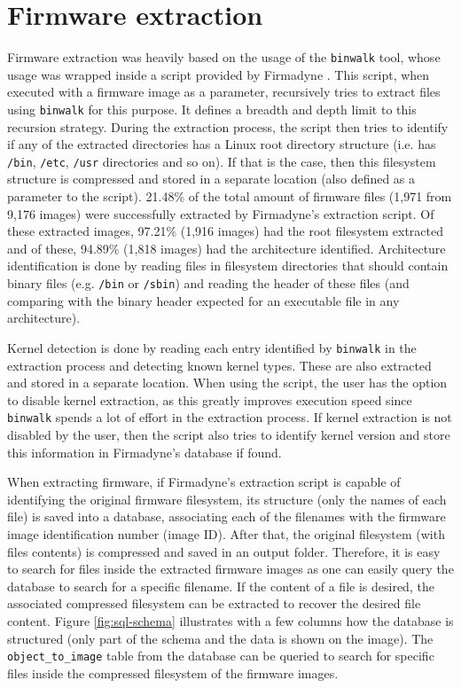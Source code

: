 \section{Firmware extraction}
\label{sec:firmware-extraction}

Firmware extraction was heavily based on the usage of the {\tt binwalk} tool, whose usage was wrapped inside a script provided by Firmadyne \cite{firmadyne}. This script, when executed with a firmware image as a parameter, recursively tries to extract files using {\tt binwalk} for this purpose. It defines a breadth and depth limit to this recursion strategy. During the extraction process, the script then tries to identify if any of the extracted directories has a Linux root directory structure (i.e. has {\tt /bin}, {\tt /etc}, {\tt /usr} directories and so on). If that is the case, then this filesystem structure is compressed and stored in a separate location (also defined as a parameter to the script). 21.48\% of the total amount of firmware files (1,971 from 9,176 images) were successfully extracted by Firmadyne's \cite{firmadyne} extraction script. Of these extracted images, 97.21\% (1,916 images) had the root filesystem extracted and of these, 94.89\% (1,818 images) had the architecture identified. Architecture identification is done by reading files in filesystem directories that should contain binary files (e.g. {\tt /bin} or {\tt /sbin}) and reading the header of these files (and comparing with the binary header expected for an executable file in any architecture).

Kernel detection is done by reading each entry identified by {\tt binwalk} in the extraction process and detecting known kernel types. These are also extracted and stored in a separate location. When using the script, the user has the option to disable kernel extraction, as this greatly improves execution speed since {\tt binwalk} spends a lot of effort in the extraction process. If kernel extraction is not disabled by the user, then the script also tries to identify kernel version and store this information in Firmadyne's \cite{firmadyne} database if found.

When extracting firmware, if Firmadyne's extraction script is capable of identifying the original firmware filesystem, its structure (only the names of each file) is saved into a database, associating each of the filenames with the firmware image identification number (image ID). After that, the original filesystem (with files contents) is compressed and saved in an output folder. Therefore, it is easy to search for files inside the extracted firmware images as one can easily query the database to search for a specific filename. If the content of a file is desired, the associated compressed filesystem can be extracted to recover the desired file content. Figure \ref{fig:sql-schema} illustrates with a few columns how the database is structured (only part of the schema and the data is shown on the image). The {\tt object\_to\_image} table from the database can be queried to search for specific files inside the compressed filesystem of the firmware images.

